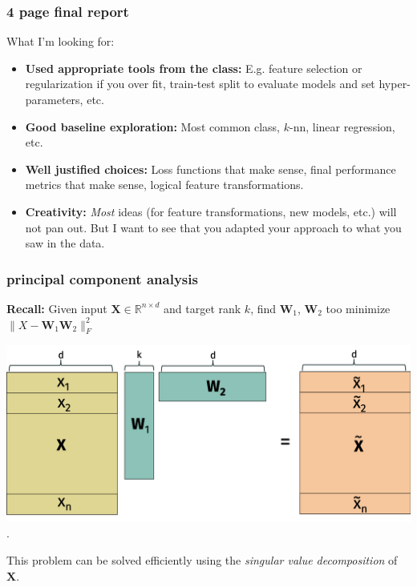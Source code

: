 \documentclass[handout,compress]{beamer}
\newcommand{\bv}[1]{\mathbf{#1}}
\newcommand{\R}{\mathbb{R}}
\begin{document}
\begin{frame}
	\frametitle{4 page final report}
	What I'm looking for:
	\begin{itemize}
		\item \textbf{Used appropriate tools from the class:} E.g. feature selection or regularization if you over fit, train-test split to evaluate models and set hyper-parameters, etc.
		\item \textbf{Good baseline exploration:} Most common class, $k$-nn, linear regression, etc.
		\item \textbf{Well justified choices:} Loss functions that make sense, final performance metrics that make sense, logical feature transformations. 
		\item \textbf{Creativity:} \emph{Most} ideas (for feature transformations, new models, etc.) will not pan out. But I want to see that you adapted your approach to what you saw in the data. 
	\end{itemize}
	
\end{frame}




\begin{frame}
	\frametitle{principal component analysis}
	\textbf{Recall:} Given input $\bv{X} \in \R^{n\times d}$ and target rank $k$, find $\bv{W}_1$, $\bv{W}_2$ too minimize $\|X - \bv{W}_1\bv{W}_2 \|_F^2$
		\begin{center}
		\includegraphics[width=.8\textwidth]{low_rank_basic.png}.
	\end{center}
This problem can be solved efficiently using the \emph{singular value decomposition} of $\bv{X}$. 
\end{frame}
\end{document}
